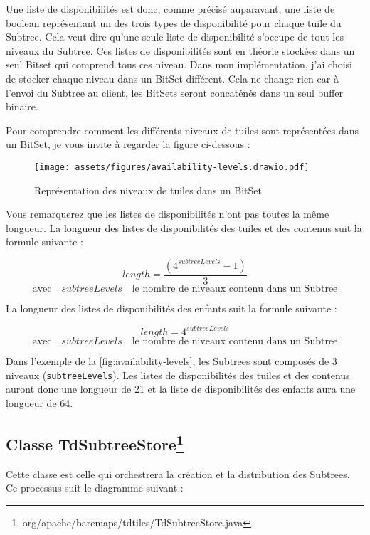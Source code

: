 Une liste de disponibilités est donc, comme précisé auparavant, une liste de boolean représentant un des trois types de disponibilité pour chaque tuile du Subtree. Cela veut dire qu'une seule liste de disponibilité s'occupe de tout les niveaux du Subtree. Ces listes de disponibilités sont en théorie stockées dans un seul Bitset qui comprend tous ces niveau. Dans mon implémentation, j'ai choisi de stocker chaque niveau dans un BitSet différent. Cela ne change rien car à l'envoi du Subtree au client, les BitSets seront concaténés dans un seul buffer binaire.

Pour comprendre comment les différents niveaux de tuiles sont représentées dans un BitSet, je vous invite à regarder la figure ci-dessous :

\begin{figure}[H]
    \centering
    \texttt{[image: assets/figures/availability-levels.drawio.pdf]}
    \caption{Représentation des niveaux de tuiles dans un BitSet}
    \label{fig:availability-levels}
\end{figure}

Vous remarquerez que les listes de disponibilités n'ont pas toutes la même longueur. La longueur des listes de disponibilités des tuiles et des contenus suit la formule suivante :

\[
length = \frac{(4^{subtreeLevels} - 1)}{3}
\]
\[
\text{avec} \quad subtreeLevels \quad \text{le nombre de niveaux contenu dans un Subtree}
\]

La longueur des listes de disponibilités des enfants suit la formule suivante :

\[
length = 4^{subtreeLevels}
\]
\[
\text{avec} \quad subtreeLevels \quad \text{le nombre de niveaux contenu dans un Subtree}
\]

Dans l'exemple de la \autoref{fig:availability-levels}, les Subtrees sont composés de 3 niveaux (\texttt{subtreeLevels}). Les listes de disponibilités des tuiles et des contenus auront donc une longueur de 21 et la liste de disponibilités des enfants aura une longueur de 64.

\subsection*{Classe TdSubtreeStore\footnote{org/apache/baremaps/tdtiles/TdSubtreeStore.java}}
\label{sec:tdsubtreestore-class}

Cette classe est celle qui orchestrera la création et la distribution des Subtrees. Ce processus suit le diagramme suivant :

